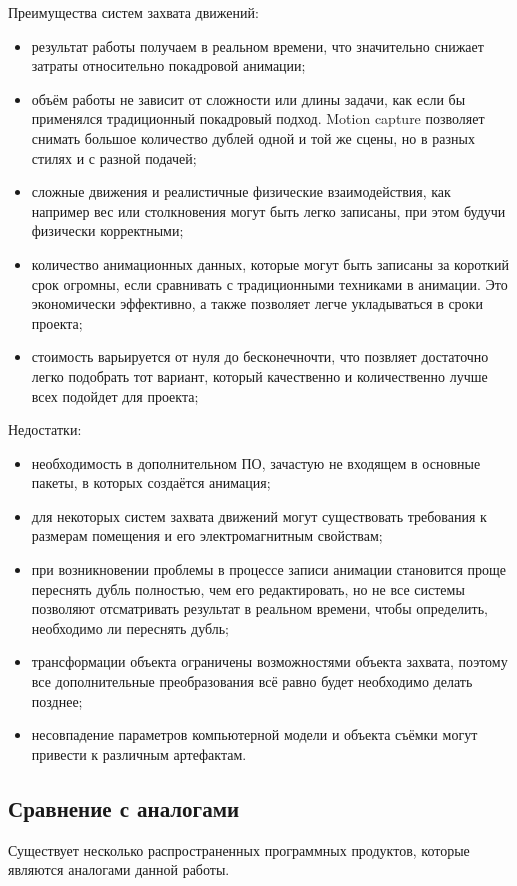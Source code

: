 Преимущества систем захвата движений:
\begin{itemize}
	\item результат работы получаем в реальном времени, что значительно снижает затраты относительно покадровой анимации;
	\item объём работы не зависит от сложности или длины задачи, как если бы применялся традиционный покадровый подход. Motion capture позволяет снимать большое количество дублей одной и той же сцены, но в разных стилях и с разной подачей;
	\item сложные движения и реалистичные физические взаимодействия, как например вес или столкновения могут быть легко записаны, при этом будучи физически корректными;
	\item количество анимационных данных, которые могут быть записаны за короткий срок огромны, если сравнивать с традиционными техниками в анимации. Это экономически эффективно, а также позволяет легче укладываться в сроки проекта;
	\item стоимость варьируется от нуля до бесконечночти, что позвляет достаточно легко подобрать тот вариант, который качественно и количественно лучше всех подойдет для проекта;
\end{itemize}

Недостатки:
\begin{itemize}
	\item необходимость в дополнительном ПО, зачастую не входящем в основные пакеты, в которых создаётся анимация;
	\item для некоторых систем захвата движений могут существовать требования к размерам помещения и его электромагнитным свойствам;
	\item при возникновении проблемы в процессе записи анимации становится проще переснять дубль полностью, чем его редактировать, но не все системы позволяют отсматривать результат в реальном времени, чтобы определить, необходимо ли переснять дубль;
	\item трансформации объекта ограничены возможностями объекта захвата, поэтому все дополнительные преобразования всё равно будет необходимо делать позднее;
	\item несовпадение параметров компьютерной модели и объекта съёмки могут привести к различным артефактам.
\end{itemize}



\subsection{Сравнение с аналогами}
Существует несколько распространенных программных продуктов, которые являются аналогами данной работы.

